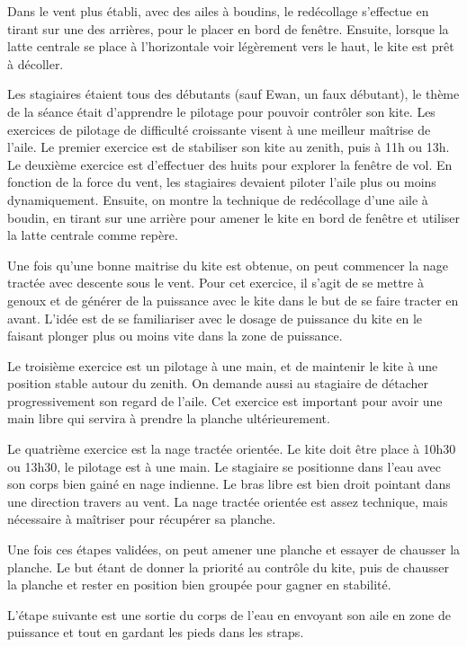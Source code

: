 \documentclass[11pt,a4paper]{report}
\begin{document}
Dans le vent plus établi, avec des ailes à boudins, le redécollage s'effectue
en tirant sur une des arrières, pour le placer en bord de fenêtre.
Ensuite, lorsque la latte centrale se place à l'horizontale voir légèrement
vers le haut, le kite est pr\^et à décoller.

Les stagiaires étaient tous des débutants (sauf Ewan, un faux débutant), 
le thème de la séance était d'apprendre le pilotage pour pouvoir contrôler son kite.
Les exercices de pilotage de difficulté croissante visent à une
meilleur maîtrise de l'aile.
Le premier exercice est de stabiliser son kite au zenith, puis à 11h ou 13h. 
Le deuxième exercice est d'effectuer des huits pour explorer la 
fen\^etre de vol.
En fonction de la force du vent, les stagiaires
devaient piloter l'aile plus ou moins dynamiquement. 
Ensuite, on montre la technique de redécollage d'une aile à 
boudin, en tirant sur une arrière pour amener le kite en bord
de fen\^etre et utiliser la latte centrale comme repère.

Une fois qu'une bonne maitrise du kite est obtenue, 
on peut commencer la  nage tractée avec descente sous 
le vent. Pour cet exercice, il s'agit de se mettre à genoux
et de générer de la puissance avec le kite dans le but
de se faire tracter en avant.  L'idée est de se familiariser
avec le dosage de puissance du kite en le faisant plonger
plus ou moins vite dans la zone de puissance.

Le troisième exercice est un pilotage à une main, et 
de maintenir le kite à une position stable autour
du zenith. On demande aussi au stagiaire de
détacher progressivement son regard de l'aile.
Cet exercice est important pour avoir une main libre
qui servira à prendre la planche ultérieurement.

Le quatrième exercice est la nage tractée orientée.
Le kite doit être place à 10h30 ou 13h30, le pilotage
est à une main. Le stagiaire se positionne dans l'eau
avec son corps bien gainé en nage indienne. Le bras
libre est bien droit pointant dans une direction 
travers au vent. La nage tractée orientée est assez
technique, mais nécessaire à maîtriser pour récupérer 
sa planche.

Une fois ces étapes validées, on peut
amener une planche et essayer de chausser la planche.
Le but étant de donner la priorité au contrôle du kite, 
puis de chausser la planche et rester en position bien 
groupée pour gagner en stabilité.


L'étape suivante est une sortie du corps de l'eau
en envoyant son aile en zone de puissance et tout en 
gardant les pieds dans les straps. 
\end{document}

